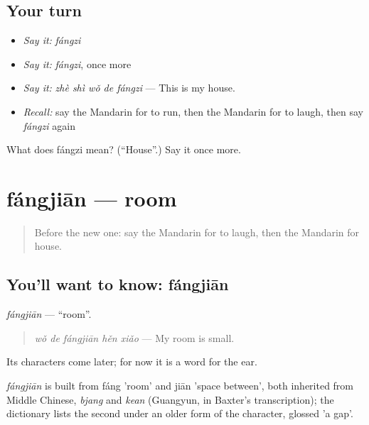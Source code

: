 \subsection*{Your turn}
\begin{itemize}
\raggedright
  \item \emph{Say it:} \emph{fángzi}
  \item \emph{Say it:} \emph{fángzi}, once more
  \item \emph{Say it:} \emph{zhè shì wǒ de fángzi} — This is my house.
  \item \emph{Recall:} say the Mandarin for to run, then the Mandarin for to laugh, then say \emph{fángzi} again
\end{itemize}

\begin{tcolorbox}[breakable,colback=teal!4,colframe=teal!35!black,title={Before you move on}]
What does fángzi mean? (\textquotedblleft{}House\textquotedblright{}.) Say it once more.
\end{tcolorbox}
\section[fángjiān]{fángjiān — room}

\label{lesson:ZH-C57-fangjian}



\begin{quote}
Before the new one: say the Mandarin for to laugh, then the Mandarin for house.
\end{quote}

\subsection*{You'll want to know: fángjiān}
\emph{fángjiān} — \textquotedblleft{}room\textquotedblright{}.

\begin{quote}
\emph{wǒ de fángjiān hěn xiǎo} — My room is small.
\end{quote}

Its characters come later; for now it is a word for the ear.

\begin{cousinweb}
\emph{fángjiān} is built from fáng 'room' and jiān 'space between', both inherited from Middle Chinese, \emph{bjang} and \emph{kean} (Guangyun, in Baxter's transcription); the dictionary lists the second under an older form of the character, glossed 'a gap'.
\end{cousinweb}

